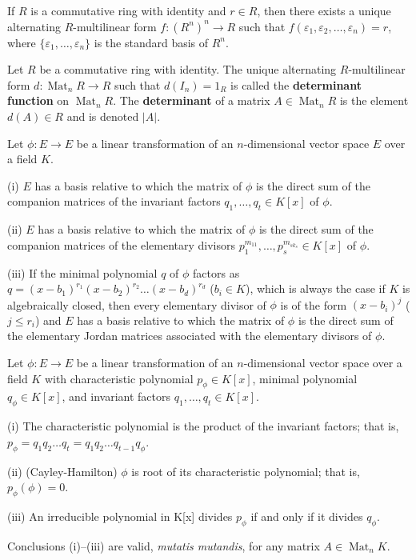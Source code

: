 \documentclass{article}
\begin{document}
\begin{theorem}
    If $R$ is a commutative ring with identity and $r \in R$, then there exists a unique alternating $R$-multilinear form $f : (R^n)^n \to R$ such that $f(\varepsilon_1, \varepsilon_2, \dots, \varepsilon_n) = r$, where $\{\varepsilon_1, \dots, \varepsilon_n\}$ is the standard basis of $R^n$.
\end{theorem}

\begin{definition}
    Let $R$ be a commutative ring with identity. The unique alternating $R$-multilinear form $d : \operatorname{Mat}_n R \to R$ such that $d(I_n) = 1_R$ is called the \textbf{determinant function} on $\operatorname{Mat}_n R$. The \textbf{determinant} of a matrix $A \in \operatorname{Mat}_n R$ is the element $d(A) \in R$ and is denoted $|A|$.
\end{definition}

\begin{theorem}
    Let $\phi : E \to E$ be a linear transformation of an $n$-dimensional vector space $E$ over a field $K$.

    (i) $E$ has a basis relative to which the matrix of $\phi$ is the direct sum of the companion matrices of the invariant factors $q_1, \dots, q_t \in K[x]$ of $\phi$.

    (ii) $E$ has a basis relative to which the matrix of $\phi$ is the direct sum of the companion matrices of the elementary divisors $p_1^{m_{11}}, \dots, p_s^{m_{sk_s}} \in K[x]$ of $\phi$.

    (iii) If the minimal polynomial $q$ of $\phi$ factors as $q = (x - b_1)^{r_1}(x - b_2)^{r_2} \dots (x - b_d)^{r_d}$ ($b_i \in K$), which is always the case if $K$ is algebraically closed, then every elementary divisor of $\phi$ is of the form $(x - b_i)^j$ ($j \le r_i$) and $E$ has a basis relative to which the matrix of $\phi$ is the direct sum of the elementary Jordan matrices associated with the elementary divisors of $\phi$.
\end{theorem}

\begin{theorem}
    Let $\phi : E \to E$ be a linear transformation of an $n$-dimensional vector space over a field $K$ with characteristic polynomial $p_{\phi} \in K[x]$, minimal polynomial $q_{\phi} \in K[x]$, and invariant factors $q_1, \dots, q_t \in K[x]$.

    (i) The characteristic polynomial is the product of the invariant factors; that is, $p_{\phi} = q_1 q_2 \dots q_t = q_1 q_2 \dots q_{t-1} q_{\phi}$.

    (ii) (Cayley-Hamilton) $\phi$ is root of its characteristic polynomial; that is, $p_{\phi}(\phi) = 0$.

    (iii) An irreducible polynomial in K[x] divides $p_{\phi} $ if and only if it divides $q_{\phi}$.

    Conclusions (i)--(iii) are valid, \textit{mutatis mutandis}, for any matrix $A \in \operatorname{Mat}_n K$.
\end{theorem}
\end{document}
